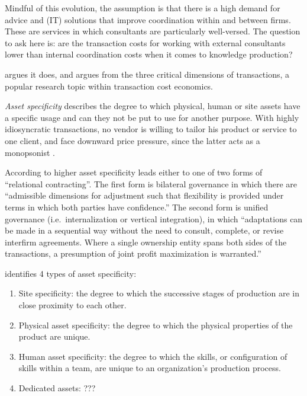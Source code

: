 \documentclass[12pt]{article}
\providecommand{\tightlist}{%
  \setlength{\itemsep}{0pt}\setlength{\parskip}{0pt}}
\begin{document}
Mindful of this evolution, the assumption is that there is a high demand
for advice and (IT) solutions that improve coordination within and
between firms. These are services in which consultants are particularly
well-versed. The question to ask here is: are the transaction costs for
working with external consultants lower than internal coordination costs
when it comes to knowledge production?

\citet[37-44]{canback1998} argues it does, and argues from the three
critical dimensions of transactions, a popular research topic within
transaction cost economics.

\emph{Asset specificity} describes the degree to which physical, human
or site assets have a specific usage and can they not be put to use for
another purpose. With highly idiosyncratic transactions, no vendor is
willing to tailor his product or service to one client, and face
downward price pressure, since the latter acts as a monopsonist \citep[
218-228]{robinson1969}.

According to \citet[250-253]{williamson1979} higher asset specificity
leads either to one of two forms of ``relational contracting''. The
first form is bilateral governance in which there are ``admissible
dimensions for adjustment such that flexibility is provided under terms
in which both parties have confidence.'' The second form is unified
governance (i.e.~internalization or vertical integration), in which
``adaptations can be made in a sequential way without the need to
consult, complete, or revise interfirm agreements. Where a single
ownership entity spans both sides of the transactions, a presumption of
joint profit maximization is warranted.''

\citet[95-96]{williamson1985} identifies 4 types of asset specificity:

\begin{enumerate}
\def\labelenumi{\arabic{enumi}.}
\tightlist
\item
  Site specificity: the degree to which the successive stages of
  production are in close proximity to each other.
\item
  Physical asset specificity: the degree to which the physical
  properties of the product are unique.
\item
  Human asset specificity: the degree to which the skills, or
  configuration of skills within a team, are unique to an organization's
  production process.
\item
  Dedicated assets: ???
\end{enumerate}
\end{document}
